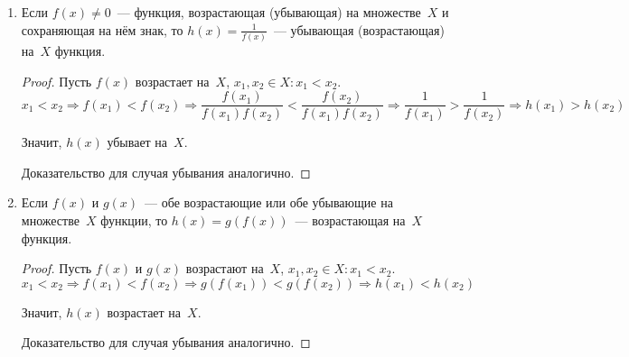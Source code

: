 \begin{enumerate}
\begin{proof}
	Значит, $h(x)$ убывает на~$X$.
	
	Доказательства для остальных трёх случаев аналогичны.
	\end{proof}
	
	\item Если $f(x) \neq 0$~--- функция, возрастающая (убывающая) на множестве~$X$ и сохраняющая на нём знак, то $h(x) = \frac1{f(x)}$~--- убывающая (возрастающая) на~$X$ функция.
	\begin{proof}
	Пусть $f(x)$ возрастает на~$X$, $x_1, x_2 \in X \colon x_1 < x_2$.
	\begin{equation*}
	x_1 < x_2 \Rightarrow
	f(x_1) < f(x_2) \Rightarrow
	\frac{f(x_1)}{f(x_1)f(x_2)} < \frac{f(x_2)}{f(x_1)f(x_2)} \Rightarrow
	\frac1{f(x_1)} > \frac1{f(x_2)} \Rightarrow
	h(x_1) > h(x_2)
	\end{equation*}
	
	Значит, $h(x)$ убывает на~$X$.
		
	Доказательство для случая убывания аналогично.
	\end{proof}
	
	\item Если $f(x)$ и $g(x)$~--- обе возрастающие или обе убывающие на множестве~$X$ функции, то $h(x) = g(f(x))$~--- возрастающая на~$X$ функция.
	\begin{proof}
	Пусть $f(x)$ и $g(x)$ возрастают на~$X$, $x_1, x_2 \in X \colon x_1 < x_2$.
	\begin{equation*}
	x_1 < x_2 \Rightarrow
	f(x_1) < f(x_2) \Rightarrow
	g(f(x_1)) < g(f(x_2)) \Rightarrow
	h(x_1) < h(x_2)
	\end{equation*}
	
	Значит, $h(x)$ возрастает на~$X$.
	
	Доказательство для случая убывания аналогично.
	\end{proof}
\end{enumerate}